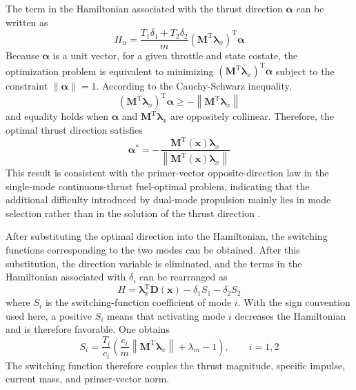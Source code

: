 \documentclass{IEEEtaes}
\begin{document}
The term in the Hamiltonian associated with the thrust direction $\bm{\alpha}$ can be written as
\begin{equation}
H_{\alpha}=\frac{T_1\delta_1+T_2\delta_2}{m}\left(\bm{M}^{\mathrm{T}}\bm{\lambda}_x\right)^{\mathrm{T}}\bm{\alpha}
\end{equation}
Because $\bm{\alpha}$ is a unit vector, for a given throttle and state costate, the optimization problem is equivalent to minimizing $\left(\bm{M}^{\mathrm{T}}\bm{\lambda}_x\right)^{\mathrm{T}}\bm{\alpha}$ subject to the constraint $\|\bm{\alpha}\|=1$. According to the Cauchy-Schwarz inequality,
\begin{equation}
\left(\bm{M}^{\mathrm{T}}\bm{\lambda}_x\right)^{\mathrm{T}}\bm{\alpha}\geq-\left\|\bm{M}^{\mathrm{T}}\bm{\lambda}_x\right\|
\end{equation}
and equality holds when $\bm{\alpha}$ and $\bm{M}^{\mathrm{T}}\bm{\lambda}_x$ are oppositely collinear. Therefore, the optimal thrust direction satisfies
\begin{equation}
\bm{\alpha}^{*}=-\frac{\bm{M}^{\mathrm{T}}(\bm{x})\bm{\lambda}_x}{\left\|\bm{M}^{\mathrm{T}}(\bm{x})\bm{\lambda}_x\right\|}
\end{equation}
This result is consistent with the primer-vector opposite-direction law in the single-mode continuous-thrust fuel-optimal problem, indicating that the additional difficulty introduced by dual-mode propulsion mainly lies in mode selection rather than in the solution of the thrust direction \cite{chi2022,taheri2020a,cline2024a}.

After substituting the optimal direction into the Hamiltonian, the switching functions corresponding to the two modes can be obtained. After this substitution, the direction variable is eliminated, and the terms in the Hamiltonian associated with $\delta_i$ can be rearranged as
\begin{equation}
H=\bm{\lambda}_x^{\mathrm{T}}\bm{D}(\bm{x})-\delta_1S_1-\delta_2S_2
\end{equation}
where $S_i$ is the switching-function coefficient of mode $i$. With the sign convention used here, a positive $S_i$ means that activating mode $i$ decreases the Hamiltonian and is therefore favorable. One obtains
\begin{equation}
S_i=\frac{T_i}{c_i}\left(\frac{c_i}{m}\left\|\bm{M}^{\mathrm{T}}\bm{\lambda}_x\right\|+\lambda_m-1\right),\qquad i=1,2
\end{equation}
The switching function therefore couples the thrust magnitude, specific impulse, current mass, and primer-vector norm.
\end{document}
